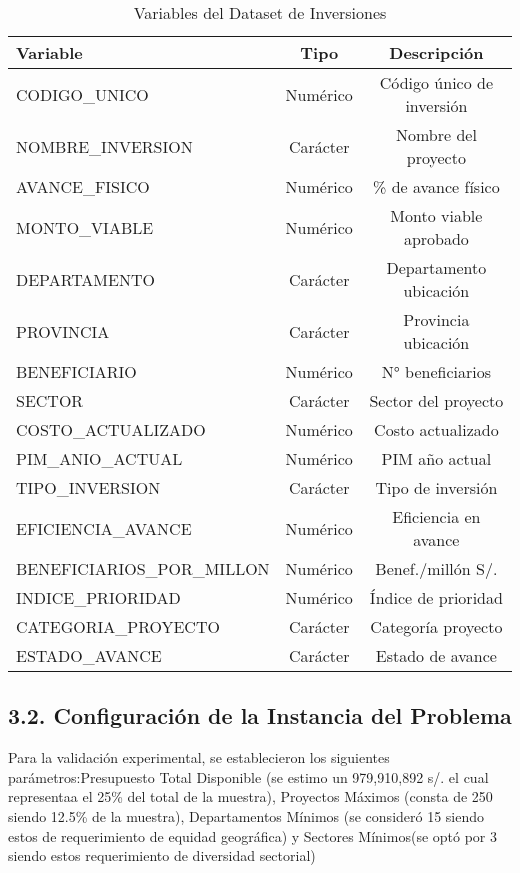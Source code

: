 \documentclass[12pt,a4paper]{article}
\begin{document}
\begin{table}[H]
\centering
\caption{Variables del Dataset de Inversiones}
\label{tab:variables_dataset}
\begin{tabular}{@{}lcc@{}}
\toprule
\textbf{Variable} & \textbf{Tipo} & \textbf{Descripción} \\
\midrule
CODIGO\_UNICO & Numérico & Código único de inversión \\
NOMBRE\_INVERSION & Carácter & Nombre del proyecto \\
AVANCE\_FISICO & Numérico & \% de avance físico \\
MONTO\_VIABLE & Numérico & Monto viable aprobado \\
DEPARTAMENTO & Carácter & Departamento ubicación \\
PROVINCIA & Carácter & Provincia ubicación \\
BENEFICIARIO & Numérico & N° beneficiarios \\
SECTOR & Carácter & Sector del proyecto \\
COSTO\_ACTUALIZADO & Numérico & Costo actualizado \\
PIM\_ANIO\_ACTUAL & Numérico & PIM año actual \\
TIPO\_INVERSION & Carácter & Tipo de inversión \\
EFICIENCIA\_AVANCE & Numérico & Eficiencia en avance \\
BENEFICIARIOS\_POR\_MILLON & Numérico & Benef./millón S/. \\
INDICE\_PRIORIDAD & Numérico & Índice de prioridad \\
CATEGORIA\_PROYECTO & Carácter & Categoría proyecto \\
ESTADO\_AVANCE & Carácter & Estado de avance \\
\bottomrule
\end{tabular}
\end{table}

\subsection*{3.2. Configuración de la Instancia del Problema}

Para la validación experimental, se establecieron los siguientes parámetros:Presupuesto Total Disponible (se estimo un 979,910,892 s/. el cual representaa el 25\% del total de la muestra), Proyectos Máximos (consta de 250 siendo 12.5\% de la muestra), Departamentos Mínimos (se consideró 15 siendo estos de requerimiento de equidad geográfica) y Sectores Mínimos(se optó por 3 siendo estos requerimiento de diversidad sectorial)
\end{document}
